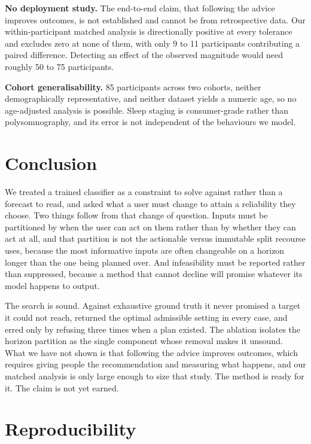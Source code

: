 \documentclass[conference]{IEEEtran}
\begin{document}
\textbf{No deployment study.} The end-to-end claim, that following the advice
improves outcomes, is not established and cannot be from retrospective data. Our
within-participant matched analysis is directionally positive at every tolerance
and excludes zero at none of them, with only 9 to 11 participants contributing a
paired difference. Detecting an effect of the observed magnitude would need
roughly 50 to 75 participants.

\textbf{Cohort generalisability.} 85 participants across two cohorts, neither
demographically representative, and neither dataset yields a numeric age, so no
age-adjusted analysis is possible. Sleep staging is consumer-grade rather than
polysomnography, and its error is not independent of the behaviours we model.

\section{Conclusion}
\label{sec:conclusion}

We treated a trained classifier as a constraint to solve against rather than a
forecast to read, and asked what a user must change to attain a reliability they
choose. Two things follow from that change of question. Inputs must be
partitioned by when the user can act on them rather than by whether they can act
at all, and that partition is not the actionable versus immutable split recourse
uses, because the most informative inputs are often changeable on a horizon
longer than the one being planned over. And infeasibility must be reported
rather than suppressed, because a method that cannot decline will promise
whatever its model happens to output.

The search is sound. Against exhaustive ground truth it never promised a target
it could not reach, returned the optimal admissible setting in every case, and
erred only by refusing three times when a plan existed. The ablation isolates
the horizon partition as the single component whose removal makes it unsound.
What we have not shown is that following the advice improves outcomes, which
requires giving people the recommendation and measuring what happens, and our
matched analysis is only large enough to size that study. The method is ready
for it. The claim is not yet earned.

\section*{Reproducibility}
\end{document}
